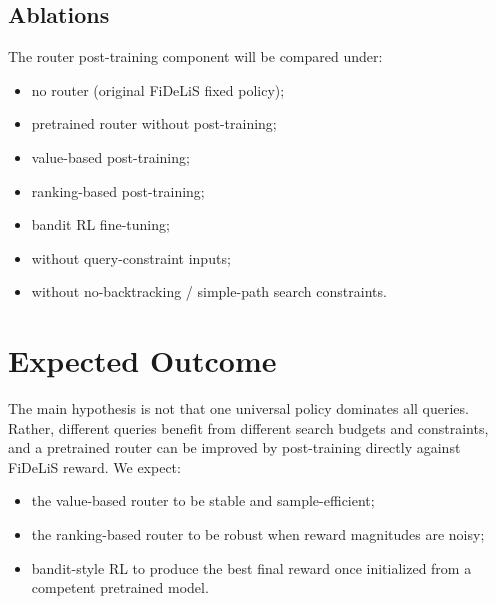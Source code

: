 \documentclass[11pt]{article}
\begin{document}
\subsection{Ablations}
The router post-training component will be compared under:
\begin{itemize}[leftmargin=1.5em]
\item no router (original FiDeLiS fixed policy);
\item pretrained router without post-training;
\item value-based post-training;
\item ranking-based post-training;
\item bandit RL fine-tuning;
\item without query-constraint inputs;
\item without no-backtracking / simple-path search constraints.
\end{itemize}

\section{Expected Outcome}
The main hypothesis is not that one universal policy dominates all queries. Rather, different queries benefit from different search budgets and constraints, and a pretrained router can be improved by post-training directly against FiDeLiS reward. We expect:
\begin{itemize}[leftmargin=1.5em]
\item the value-based router to be stable and sample-efficient;
\item the ranking-based router to be robust when reward magnitudes are noisy;
\item bandit-style RL to produce the best final reward once initialized from a competent pretrained model.
\end{itemize}
\end{document}
